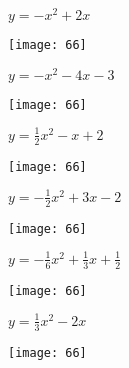 \documentclass[a4paper]{oblivoir}
\begin{document}
\clearpage
\begin{minipage}{0.45\textwidth}\centering
\(y=-x^2+2x\)
\par\bigskip\texttt{[image: 66]}
\end{minipage}
\begin{minipage}{0.45\textwidth}\centering
\(y=-x^2-4x-3\)
\par\bigskip\texttt{[image: 66]}
\end{minipage}\bigskip\bigskip\par
\begin{minipage}{0.45\textwidth}\centering
\(y=\frac12x^2-x+2\)
\par\bigskip\texttt{[image: 66]}
\end{minipage}
\begin{minipage}{0.45\textwidth}\centering
\(y=-\frac12x^2+3x-2\)
\par\bigskip\texttt{[image: 66]}
\end{minipage}\bigskip\bigskip\par
\begin{minipage}{0.45\textwidth}\centering
\(y=-\frac16x^2+\frac13x+\frac12\)
\par\bigskip\texttt{[image: 66]}
\end{minipage}
\begin{minipage}{0.45\textwidth}\centering
\(y=\frac13x^2-2x\)
\par\bigskip\texttt{[image: 66]}
\end{minipage}\bigskip\bigskip\par
\end{document}
